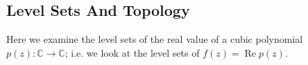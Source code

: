 \subsection{Level Sets And Topology}

Here we examine the level sets of the real value of a cubic polynomial \(p(z) : \mathbb C \to \mathbb C\); i.e.
we look at the level sets of \(f(z) = \operatorname{Re} p(z)\).

